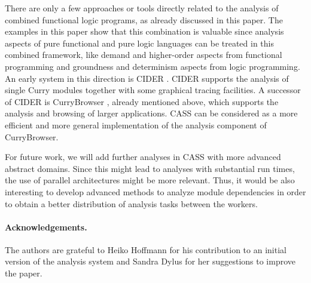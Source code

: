 \documentclass{llncs}
\begin{document}
There are only a few approaches or tools directly related
to the analysis of combined functional logic programs, as already
discussed in this paper.
The examples in this paper show that this combination is valuable
since analysis aspects of pure functional and pure logic languages
can be treated in this combined framework, like demand and higher-order
aspects from functional programming and groundness and determinism
aspects from logic programming.
An early system in this direction is CIDER \cite{HanusKoj01WFLP}.
CIDER supports the analysis of single Curry modules
together with some graphical tracing facilities.
A successor of CIDER is CurryBrowser \cite{Hanus06WLPE},
already mentioned above, which supports the analysis
and browsing of larger applications.
CASS can be considered as a more efficient and more general implementation
of the analysis component of CurryBrowser.

For future work, we will add further analyses in CASS with more advanced
abstract domains. Since this might lead to analyses with substantial
run times,
the use of parallel architectures might be more relevant.
Thus, it would be also interesting to develop advanced methods
to analyze module dependencies in order to obtain a better distribution
of analysis tasks between the workers.


\paragraph{Acknowledgements.}
The authors are grateful to Heiko Hoffmann for his contribution
to an initial version of the analysis system and Sandra Dylus
for her suggestions to improve the paper.
\end{document}
